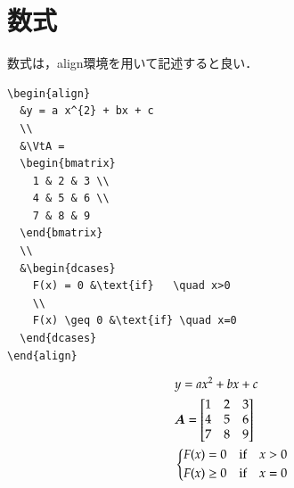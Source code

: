 \documentclass[../main/main]{subfiles}
\begin{document}
\section{数式}
数式は，align環境を用いて記述すると良い．
\begin{lstlisting}[language={[latex]TeX}]
\begin{align}
  &y = a x^{2} + bx + c
  \\
  &\VtA = 
  \begin{bmatrix}
    1 & 2 & 3 \\
    4 & 5 & 6 \\
    7 & 8 & 9
  \end{bmatrix}
  \\
  &\begin{dcases}
    F(x) = 0 &\text{if}   \quad x>0
    \\
    F(x) \geq 0 &\text{if} \quad x=0
  \end{dcases}
\end{align}
\end{lstlisting}
\begin{align}
  &y = a x^{2} + bx + c
  \\
  &\bm{A} = 
  \begin{bmatrix}
    1 & 2 & 3 \\
    4 & 5 & 6 \\
    7 & 8 & 9
  \end{bmatrix}
  \\
  &\begin{dcases}
    F(x) = 0 &\text{if}   \quad x>0
    \\
    F(x) \geq 0 &\text{if} \quad x=0
  \end{dcases}
\end{align}

\newpage
\end{document}
